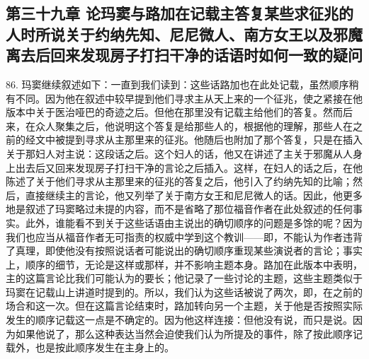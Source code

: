 \subsection{第三十九章 论玛窦与路加在记载主答复某些求征兆的人时所说关于约纳先知、尼尼微人、南方女王以及邪魔离去后回来发现房子打扫干净的话语时如何一致的疑问}

86. 玛窦继续叙述如下：一直到我们读到：这些话路加也在此处记载，虽然顺序稍有不同。因为他在叙述中较早提到他们寻求主从天上来的一个征兆，使之紧接在他版本中关于医治哑巴的奇迹之后。但他在那里没有记载主给他们的答复。然而后来，在众人聚集之后，他说明这个答复是给那些人的，根据他的理解，那些人在之前的经文中被提到寻求从主那里来的征兆。他随后也附加了那个答复，只是在插入关于那妇人对主说：这段话之后。这个妇人的话，他又在讲述了主关于邪魔从人身上出去后又回来发现房子打扫干净的言论之后插入。这样，在妇人的话之后，在他陈述了关于他们寻求从主那里来的征兆的答复之后，他引入了约纳先知的比喻；然后，直接继续主的言论，他又列举了关于南方女王和尼尼微人的话。因此，他更多地是叙述了玛窦略过未提的内容，而不是省略了那位福音作者在此处叙述的任何事实。此外，谁能看不到关于这些话语由主说出的确切顺序的问题是多馀的呢？因为我们也应当从福音作者无可指责的权威中学到这个教训——即，不能认为作者违背了真理，即使他没有按照说话者可能说出的确切顺序重现某些演说者的言论；事实上，顺序的细节，无论是这样或那样，并不影响主题本身。路加在此版本中表明，主的这篇言论比我们可能认为的要长；他记录了一些讨论的主题，这些主题类似于玛窦在记载山上讲道时提到的。所以，我们认为这些话被说了两次，即，在之前的场合和这一次。但在这篇言论结束时，路加转向另一个主题，关于他是否按照实际发生的顺序记载这一点是不确定的。因为他这样连接：但他没有说，而只是说。因为如果他说了，那么这种表达当然会迫使我们认为所提及的事件，除了按此顺序记载外，也是按此顺序发生在主身上的。\par



\section{}

